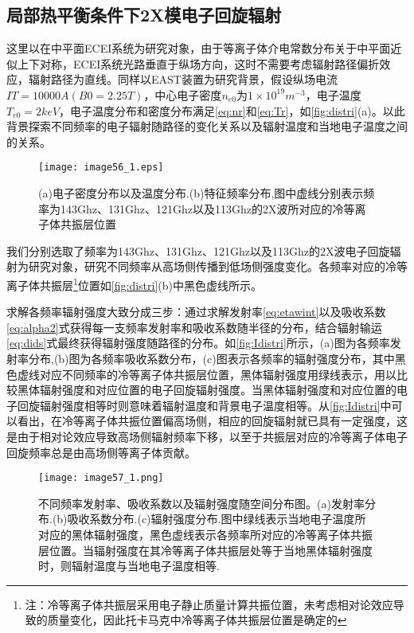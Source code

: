 \subsection{局部热平衡条件下2X模电子回旋辐射}
这里以在中平面ECEI系统为研究对象，由于等离子体介电常数分布关于中平面近似上下对称，ECEI系统光路垂直于纵场方向，这时不需要考虑辐射路径偏折效应，辐射路径为直线。同样以EAST装置为研究背景，假设纵场电流$IT=10000A(B0=2.25T) $，中心电子密度$n_{e0}$为$1\times10^{19}m^{-3}$，电子温度$T_{e0}=2keV$，电子温度分布和密度分布满足\autoref{eq:nr}和\autoref{eq:Tr}，如\autoref{fig:distri}(a)。以此背景探索不同频率的电子辐射随路径的变化关系以及辐射温度和当地电子温度之间的关系。
\begin{figure}[ht]
\centering
\texttt{[image: image56\_1.eps]}
\caption{\label{fig:distri}(a)电子密度分布以及温度分布.(b)特征频率分布,图中虚线分别表示频率为143Ghz、131Ghz、121Ghz以及113Ghz的2X波所对应的冷等离子体共振层位置}
\end{figure}
我们分别选取了频率为143Ghz、131Ghz、121Ghz以及113Ghz的2X波电子回旋辐射为研究对象，研究不同频率从高场侧传播到低场侧强度变化。各频率对应的冷等离子体共振层\footnote{注：冷等离子体共振层采用电子静止质量计算共振位置，未考虑相对论效应导致的质量变化，因此托卡马克中冷等离子体共振层位置是确定的}位置如\autoref{fig:distri}(b)中黑色虚线所示。
\par 求解各频率辐射强度大致分成三步：通过求解发射率\autoref{eq:etawint}以及吸收系数\autoref{eq:alpha2}式获得每一支频率发射率和吸收系数随半径的分布，结合辐射输运\autoref{eq:dids}式最终获得辐射强度随路径的分布。如\autoref{fig:Idistri}所示，(a)图为各频率发射率分布,(b)图为各频率吸收系数分布，(c)图表示各频率的辐射强度分布，其中黑色虚线对应不同频率的冷等离子体共振层位置，黑体辐射强度用绿线表示，用以比较黑体辐射强度和对应位置的电子回旋辐射强度。当黑体辐射强度和对应位置的电子回旋辐射强度相等时则意味着辐射温度和背景电子温度相等。从\autoref{fig:Idistri}中可以看出，在冷等离子体共振位置偏高场侧，相应的回旋辐射就已具有一定强度，这是由于相对论效应导致高场侧辐射频率下移，以至于共振层对应的冷等离子体电子回旋频率总是由高场侧等离子体贡献。
\begin{figure}[H]
\centering
\texttt{[image: image57\_1.png]}
\caption{\label{fig:Idistri}不同频率发射率、吸收系数以及辐射强度随空间分布图。(a)发射率分布.(b)吸收系数分布.(c)辐射强度分布.图中绿线表示当地电子温度所对应的黑体辐射强度，黑色虚线表示各频率所对应的冷等离子体共振层位置。当辐射强度在其冷等离子体共振层处等于当地黑体辐射强度时，则辐射温度与当地电子温度相等.}
\end{figure}

